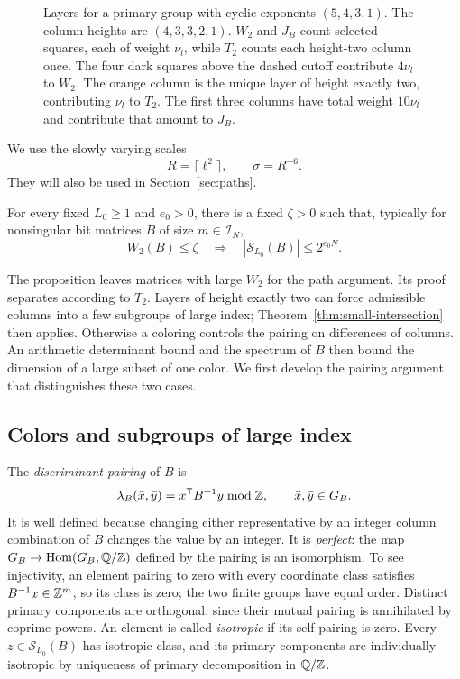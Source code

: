 \begin{figure}[H]
 \centering
 
 \caption{Layers for a primary group with cyclic exponents
 \((5,4,3,1)\). The column heights are \((4,3,3,2,1)\).
 \(W_2\) and \(J_B\) count selected squares, each of weight
 \(\nu_l\), while \(T_2\) counts each height-two column once.
 The four dark squares above the
 dashed cutoff contribute \(4\nu_l\) to \(W_2\). The orange column
 is the unique layer of height exactly two, contributing \(\nu_l\)
 to \(T_2\). The first three columns have total weight \(10\nu_l\)
 and contribute that amount to \(J_B\).}
 \label{fig:layers}
\end{figure}

We use the slowly varying scales
\begin{equation}\label{eq:layer-scales}
 R=\lceil\ell^2\rceil,
 \qquad \sigma=R^{-6}.
\end{equation}
They will also be used in Section~\ref{sec:paths}.

\begin{proposition}\label{prop:static-column}
For every fixed \(L_0\ge1\) and \(e_0>0\), there is a fixed
\(\zeta>0\) such that, typically for nonsingular bit matrices
\(B\) of size \(m\in\mathcal I_N\),
\[
 W_2(B)\le\zeta
 \quad\Longrightarrow\quad
 |\mathcal S_{L_0}(B)|\le2^{e_0N}.
\]
\end{proposition}

The proposition leaves matrices with large \(W_2\) for the path
argument. Its proof separates according to \(T_2\). Layers of height
exactly two can force admissible columns into a few subgroups of large
index; Theorem~\ref{thm:small-intersection} then applies. Otherwise
a coloring controls the pairing on differences of columns. An
arithmetic determinant bound and the spectrum of \(B\) then bound
the dimension of a large subset of one color. We first develop the
pairing argument that distinguishes these two cases.

\subsection{Colors and subgroups of large index}

The \emph{discriminant pairing} of \(B\) is
\begin{equation}\label{eq:discriminant-pairing}
 \lambda_B(\bar x,\bar y)
   =x^{\mathsf T}B^{-1}y\bmod\mathbb Z,
 \qquad \bar x,\bar y\in G_B.
\end{equation}
It is well defined because changing either representative by an
integer column combination of \(B\) changes the value by an integer.
It is \emph{perfect}: the map
\(G_B\to\operatorname{Hom}(G_B,\mathbb Q/\mathbb Z)\) defined by the pairing
is an isomorphism. To see injectivity, an element pairing to zero
with every coordinate class satisfies \(B^{-1}x\in\mathbb Z^m\), so its
class is zero; the two finite groups have equal order.
Distinct primary components are orthogonal, since their mutual
pairing is annihilated by coprime powers. An element is called
\emph{isotropic} if its self-pairing is zero. Every
\(z\in\mathcal S_{L_0}(B)\) has isotropic class, and its primary
components are individually isotropic by uniqueness of primary
decomposition in \(\mathbb Q/\mathbb Z\).

